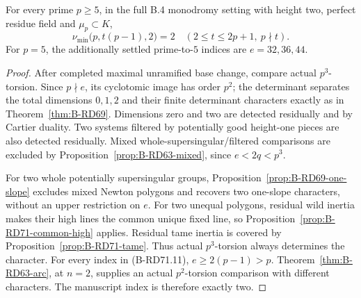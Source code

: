 \begin{theorem}
\label{thm:B-RD71}
For every prime \(p\ge5\), in the full B.4 monodromy setting
with height two, perfect residue field and \(\mu_p\subset K\),
\[
 \boxed{\displaystyle
 \nu_{\min}\bigl(p,t(p-1),2\bigr)=2
 \quad(2\le t\le2p+1,\ p\nmid t).}
 \tag{B-RD71.17}
\]
For \(p=5\), the additionally settled prime-to-\(5\) indices
are \(e=32,36,44\).
\end{theorem}
\begin{proof}
After completed maximal unramified base change, compare
actual \(p^3\)-torsion. Since \(p\nmid e\), its cyclotomic
image has order \(p^2\); the determinant separates the
total dimensions \(0,1,2\) and their finite determinant
characters exactly as in Theorem~\ref{thm:B-RD69}.
Dimensions zero and two are detected residually and by
Cartier duality. Two systems filtered by potentially good
height-one pieces are also detected residually.
Mixed whole-supersingular/filtered comparisons are excluded
by Proposition~\ref{prop:B-RD63-mixed}, since \(e<2q<p^3\).

For two whole potentially supersingular groups,
Proposition~\ref{prop:B-RD69-one-slope} excludes mixed
Newton polygons and recovers two one-slope characters,
without an upper restriction on \(e\).
For two unequal polygons, residual wild inertia makes
their high lines the common unique fixed line, so
Proposition~\ref{prop:B-RD71-common-high} applies.
Residual tame inertia is covered by
Proposition~\ref{prop:B-RD71-tame}.
Thus actual \(p^3\)-torsion always determines the character.
For every index in (B-RD71.11), \(e\ge2(p-1)>p\).
Theorem~\ref{thm:B-RD63-arc}, at \(n=2\), supplies an actual
\(p^2\)-torsion comparison with different characters.
The manuscript index is therefore exactly two.
\end{proof}

